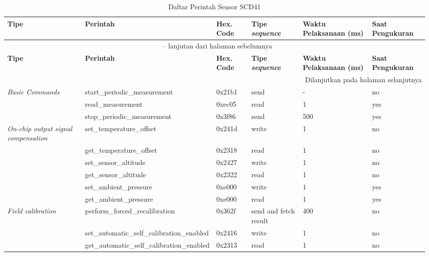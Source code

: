         \begin{landscape}
        \begin{longtable}{|p{2cm}|p{8cm}|p{1.5cm}|p{2cm}|p{2cm}|p{2cm}|}
        \caption{Daftar Perintah Sensor SCD41}
        \label{tab:command_table} \\
        \hline
        \textbf{Tipe} & \textbf{Perintah} & \textbf{Hex. Code} & \textbf{Tipe \textit{sequence}} & \textbf{Waktu Pelaksanaan (ms)} & \textbf{Saat Pengukuran} \\ 
        \hline
        \endfirsthead
        \multicolumn{6}{c}{{ \tablename\ \thetable{} -- lanjutan dari halaman sebelumnya}} \\
        \hline
        \textbf{Tipe} & \textbf{Perintah} & \textbf{Hex. Code} & \textbf{Tipe \textit{sequence}} & \textbf{Waktu Pelaksanaan (ms)} & \textbf{Saat Pengukuran} \\ 
        \hline
        \endhead
        \hline \multicolumn{6}{|r|}{{Dilanjutkan pada halaman selanjutnya}} \\ \hline
        \endfoot
        \endlastfoot
        
        \textit{Basic Commands} & start\_periodic\_measurement & 0x21b1 & send & - & no \\
        & read\_measurement & 0xec05 & read & 1 & yes \\
        & stop\_periodic\_measurement & 0x3f86 & send & 500 & yes \\
        \hline
        
        \textit{On-chip output signal compensation} & set\_temperature\_offset & 0x241d & write & 1 & no \\
        & get\_temperature\_offset & 0x2318 & read & 1 & no \\
        & set\_sensor\_altitude & 0x2427 & write & 1 & no \\
        & get\_sensor\_altitude & 0x2322 & read & 1 & no \\
        & set\_ambient\_pressure & 0xe000 & write & 1 & yes \\
        & get\_ambient\_pressure & 0xe000 & read & 1 & yes \\
        \hline
        
        \textit{Field calibration} & perform\_forced\_recalibration & 0x362f & send and fetch result & 400 & no \\
        & set\_automatic\_self\_calibration\_enabled & 0x2416 & write & 1 & no \\
        & get\_automatic\_self\_calibration\_enabled & 0x2313 & read & 1 & no \\
        \hline
        

\end{longtable}
\end{landscape}
